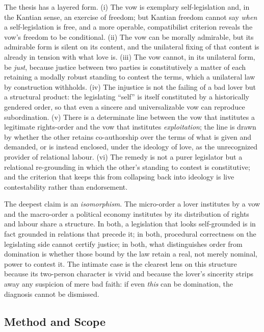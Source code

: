 \documentclass[11pt,a4paper]{article}
\begin{document}
The thesis has a layered form. (i) The vow is exemplary self-legislation and, in the Kantian sense, an exercise of freedom; but Kantian freedom cannot say \emph{when} a self-legislation is free, and a more operable, compatibilist criterion reveals the vow's freedom to be conditional. (ii) The vow can be morally admirable, but its admirable form is silent on its content, and the unilateral fixing of that content is already in tension with what love is. (iii) The vow cannot, in its unilateral form, be \emph{just}, because justice between two parties is constitutively a matter of each retaining a modally robust standing to contest the terms, which a unilateral law by construction withholds. (iv) The injustice is not the failing of a bad lover but a structural product: the legislating ``self'' is itself constituted by a historically gendered order, so that even a sincere and universalizable vow can reproduce subordination. (v) There is a determinate line between the vow that institutes a legitimate rights-order and the vow that institutes \emph{exploitation}; the line is drawn by whether the other retains co-authorship over the terms of what is given and demanded, or is instead enclosed, under the ideology of love, as the unrecognized provider of relational labour. (vi) The remedy is not a purer legislator but a relational re-grounding in which the other's standing to contest is constitutive; and the criterion that keeps this from collapsing back into ideology is live contestability rather than endorsement.

The deepest claim is an \emph{isomorphism}. The micro-order a lover institutes by a vow and the macro-order a political economy institutes by its distribution of rights and labour share a structure. In both, a legislation that looks self-grounded is in fact grounded in relations that precede it; in both, procedural correctness on the legislating side cannot certify justice; in both, what distinguishes order from domination is whether those bound by the law retain a real, not merely nominal, power to contest it. The intimate case is the clearest lens on this structure because its two-person character is vivid and because the lover's sincerity strips away any suspicion of mere bad faith: if even \emph{this} can be domination, the diagnosis cannot be dismissed.

\subsection{Method and Scope}
\end{document}
